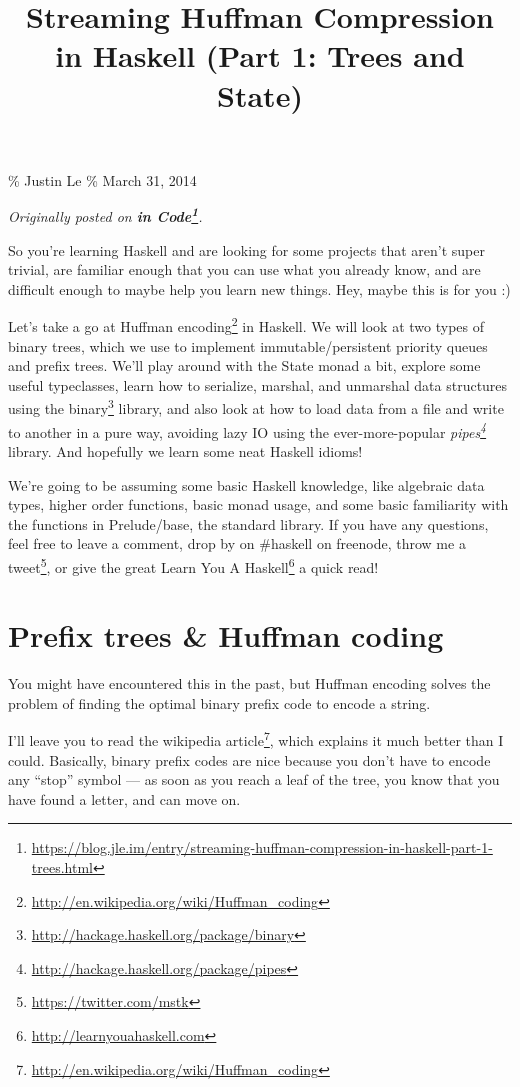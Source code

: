 \documentclass[]{article}
\title{Streaming Huffman Compression in Haskell (Part 1: Trees and State)}
\renewcommand{\href}[2]{#2\footnote{\url{#1}}}
\begin{document}
\maketitle

\% Justin Le \% March 31, 2014

\emph{Originally posted on
\textbf{\href{https://blog.jle.im/entry/streaming-huffman-compression-in-haskell-part-1-trees.html}{in
Code}}.}

So you're learning Haskell and are looking for some projects that aren't super
trivial, are familiar enough that you can use what you already know, and are
difficult enough to maybe help you learn new things. Hey, maybe this is for you
:)

Let's take a go at \href{http://en.wikipedia.org/wiki/Huffman_coding}{Huffman
encoding} in Haskell. We will look at two types of binary trees, which we use to
implement immutable/persistent priority queues and prefix trees. We'll play
around with the State monad a bit, explore some useful typeclasses, learn how to
serialize, marshal, and unmarshal data structures using the
\href{http://hackage.haskell.org/package/binary}{binary} library, and also look
at how to load data from a file and write to another in a pure way, avoiding
lazy IO using the ever-more-popular
\emph{\href{http://hackage.haskell.org/package/pipes}{pipes}} library. And
hopefully we learn some neat Haskell idioms!

We're going to be assuming some basic Haskell knowledge, like algebraic data
types, higher order functions, basic monad usage, and some basic familiarity
with the functions in Prelude/base, the standard library. If you have any
questions, feel free to leave a comment, drop by on \#haskell on freenode, throw
me a \href{https://twitter.com/mstk}{tweet}, or give the great
\href{http://learnyouahaskell.com}{Learn You A Haskell} a quick read!

\section{Prefix trees \& Huffman coding}\label{prefix-trees-huffman-coding}

You might have encountered this in the past, but Huffman encoding solves the
problem of finding the optimal binary prefix code to encode a string.

I'll leave you to read \href{http://en.wikipedia.org/wiki/Huffman_coding}{the
wikipedia article}, which explains it much better than I could. Basically,
binary prefix codes are nice because you don't have to encode any ``stop''
symbol --- as soon as you reach a leaf of the tree, you know that you have found
a letter, and can move on.
\end{document}
